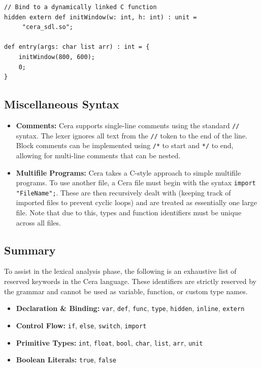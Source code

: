 \documentclass[11pt, a4paper]{article}
\begin{document}
\begin{lstlisting}[language=Cera, title={FFI Binding Example}, basicstyle=\ttfamily]
// Bind to a dynamically linked C function
hidden extern def initWindow(w: int, h: int) : unit =
     "cera_sdl.so";

def entry(args: char list arr) : int = {
    initWindow(800, 600);
    0;
}
\end{lstlisting}

\subsection{Miscellaneous Syntax}
\noindent
\begin{itemize}
    \item \textbf{Comments:} Cera supports single-line comments using the standard \texttt{//} syntax. The lexer ignores all text from the \texttt{//} token to the end of the line. Block comments can be implemented using \texttt{/*} to start and \texttt{*/} to end, allowing for multi-line comments that can be nested.
    \item \textbf{Multifile Programs:} Cera takes a C-style approach to simple multifile programs. To use another file, a Cera file must begin with the syntax \texttt{import "FileName";}. These are then recursively dealt with (keeping track of imported files to prevent cyclic loops) and are treated as essentially one large file. Note that due to this, types and function identifiers must be unique across all files.
\end{itemize}

\subsection{Summary}
\noindent
To assist in the lexical analysis phase, the following is an exhaustive list of reserved keywords in the Cera language. These identifiers are strictly reserved by the grammar and cannot be used as variable, function, or custom type names.

\begin{itemize}
    \item \textbf{Declaration \& Binding:} \texttt{var}, \texttt{def}, \texttt{func}, \texttt{type}, \texttt{hidden}, \texttt{inline}, \texttt{extern}
    \item \textbf{Control Flow:} \texttt{if}, \texttt{else}, \texttt{switch}, \texttt{import}
    \item \textbf{Primitive Types:} \texttt{int}, \texttt{float}, \texttt{bool}, \texttt{char}, \texttt{list}, \texttt{arr}, \texttt{unit}
    \item \textbf{Boolean Literals:} \texttt{true}, \texttt{false}
\end{itemize}
\end{document}
